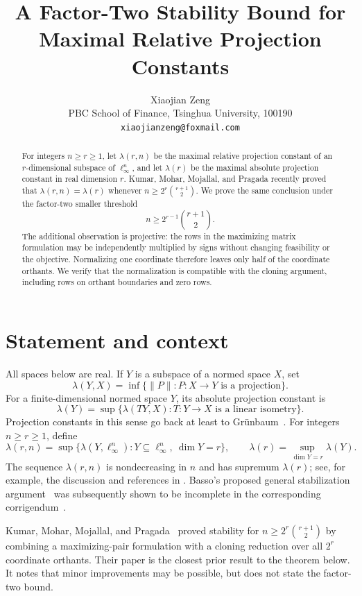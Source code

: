 \documentclass[11pt]{article}
\title{A Factor-Two Stability Bound for\\Maximal Relative Projection Constants}
\author{Xiaojian Zeng\\
  \small PBC School of Finance, Tsinghua University, 100190\\
  \small \texttt{xiaojianzeng@foxmail.com}}
\date{}
\begin{document}
\maketitle

\begin{abstract}
For integers $n\ge r\ge1$, let $\lambda(r,n)$ be the maximal relative
projection constant of an $r$-dimensional subspace of $\ell_\infty^n$, and
let $\lambda(r)$ be the maximal absolute projection constant in real
dimension $r$.  Kumar, Mohar, Mojallal, and Pragada recently proved that
$\lambda(r,n)=\lambda(r)$ whenever
$n\ge 2^r\binom{r+1}{2}$.  We prove the same conclusion under the
factor-two smaller threshold
\[
 n\ge 2^{r-1}\binom{r+1}{2}.
\]
The additional observation is projective: the rows in the maximizing
matrix formulation may be independently multiplied by signs without
changing feasibility or the objective.  Normalizing one coordinate
therefore leaves only half of the coordinate orthants.  We verify that the
normalization is compatible with the cloning argument, including rows on
orthant boundaries and zero rows.
\end{abstract}

\section{Statement and context}

All spaces below are real.  If $Y$ is a subspace of a normed space $X$, set
\[
 \lambda(Y,X)=\inf\{\lVert P\rVert:P:X\to Y\text{ is a projection}\}.
\]
For a finite-dimensional normed space $Y$, its absolute projection constant
is
\[
 \lambda(Y)=\sup\{\lambda(TY,X):T:Y\to X\text{ is a linear isometry}\}.
\]
Projection constants in this sense go back at least to
Grünbaum~\cite{Grunbaum1960}.  For integers $n\ge r\ge1$, define
\[
 \lambda(r,n)=\sup\{\lambda(Y,\ell_\infty^n):
       Y\subseteq\ell_\infty^n,\ \dim Y=r\},
 \qquad
 \lambda(r)=\sup_{\dim Y=r}\lambda(Y).
\]
The sequence $\lambda(r,n)$ is nondecreasing in $n$ and has supremum
$\lambda(r)$; see, for example, the discussion and references in
\cite{FoucartSkrzypek2017,KumarEtAl2026}.  Basso's proposed general
stabilization argument~\cite{Basso2019} was subsequently shown to be
incomplete in the corresponding corrigendum~\cite{Basso2024}.

Kumar, Mohar, Mojallal, and Pragada~\cite{KumarEtAl2026} proved stability
for $n\ge2^r\binom{r+1}{2}$ by combining a maximizing-pair formulation with
a cloning reduction over all $2^r$ coordinate orthants.  Their paper is the
closest prior result to the theorem below.  It notes that minor improvements
may be possible, but does not state the factor-two bound.
\end{document}
